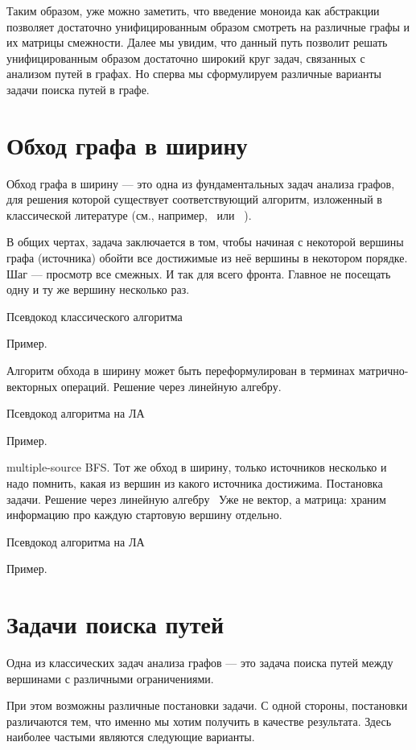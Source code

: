 Таким образом, уже можно заметить, что введение моноида как абстракции позволяет достаточно унифицированным образом смотреть на различные графы и их матрицы смежности. Далее мы увидим, что данный путь позволит решать унифицированным образом достаточно широкий круг задач, связанных с анализом путей в графах. Но сперва мы сформулируем различные варианты задачи поиска путей в графе. %

\section{Обход графа в ширину}

Обход графа в ширину --- это одна из фундаментальных задач анализа графов, для решения которой существует соответствующий алгоритм, изложенный в классической литературе (см., например,~\cite{} или ~\cite{}).

В общих чертах, задача заключается в том, чтобы начиная с некоторой вершины графа (источника) обойти все достижимые из неё вершины в некотором порядке. Шаг --- просмотр все смежных. И так для всего фронта. Главное не посещать одну и ту же вершину несколько раз.

Псевдокод классического алгоритма

Пример.

Алгоритм обхода в ширину может быть переформулирован в терминах матрично-векторных операций. Решение через линейную алгебру.

Псевдокод алгоритма на ЛА

Пример.

multiple-source BFS. Тот же обход в ширину, только источников несколько и надо помнить, какая из вершин из какого источника достижима. Постановка задачи. Решение через линейную алгебру~\cite{9286186} Уже не вектор, а матрица: храним информацию про каждую стартовую вершину отдельно.

Псевдокод алгоритма на ЛА

Пример.

\section{Задачи поиска путей}

Одна из классических задач анализа графов --- это задача поиска путей между вершинами с различными ограничениями.

При этом возможны различные постановки задачи.
С одной стороны, постановки различаются тем, что именно мы хотим получить в качестве результата. Здесь наиболее частыми являются следующие варианты.

